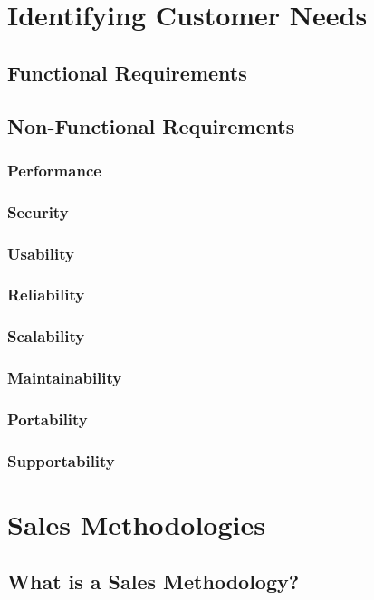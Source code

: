 \section{Identifying Customer Needs}\mbox{}
    \subsection{Functional Requirements}\mbox{}
    \subsection{Non-Functional Requirements}\mbox{}
        \subsubsection{Performance}\mbox{}
        \subsubsection{Security}\mbox{}
        \subsubsection{Usability}\mbox{}
        \subsubsection{Reliability}\mbox{}
        \subsubsection{Scalability}\mbox{}
        \subsubsection{Maintainability}\mbox{}
        \subsubsection{Portability}\mbox{}
        \subsubsection{Supportability}\mbox{}

\section{Sales Methodologies}\mbox{}
    \subsection{What is a Sales Methodology?}\mbox{}
